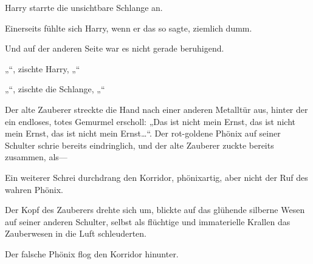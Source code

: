 Harry starrte die unsichtbare Schlange an.

Einerseits fühlte sich Harry, wenn er das so sagte, ziemlich dumm.

Und auf der anderen Seite war es nicht gerade beruhigend.

„“, zischte Harry, „“

„“, zischte die Schlange, „“

\later

Der alte Zauberer streckte die Hand nach einer anderen Metalltür aus, hinter der ein endloses, totes Gemurmel erscholl: „Das ist nicht mein Ernst, das ist nicht mein Ernst, das ist nicht mein Ernst…“. Der rot-goldene Phönix auf seiner Schulter schrie bereits eindringlich, und der alte Zauberer zuckte bereits zusammen, als—

Ein weiterer Schrei durchdrang den Korridor, phönixartig, aber nicht der Ruf des wahren Phönix.

Der Kopf des Zauberers drehte sich um, blickte auf das glühende silberne Wesen auf seiner anderen Schulter, selbst als flüchtige und immaterielle Krallen das Zauberwesen in die Luft schleuderten.

Der falsche Phönix flog den Korridor hinunter.

